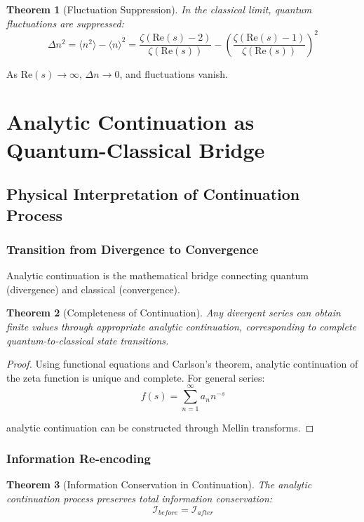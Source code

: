\documentclass[11pt]{article}
\theoremstyle{plain}
\newtheorem{theorem}{Theorem}[section]
\theoremstyle{definition}
\theoremstyle{remark}
\begin{document}
\begin{theorem}[Fluctuation Suppression]
In the classical limit, quantum fluctuations are suppressed:
$$\Delta n^2 = \langle n^2 \rangle - \langle n \rangle^2 = \frac{\zeta(\text{Re}(s)-2)}{\zeta(\text{Re}(s))} - \left(\frac{\zeta(\text{Re}(s)-1)}{\zeta(\text{Re}(s))}\right)^2$$
\end{theorem}

As $\text{Re}(s) \to \infty$, $\Delta n \to 0$, and fluctuations vanish.

\section{Analytic Continuation as Quantum-Classical Bridge}

\subsection{Physical Interpretation of Continuation Process}

\subsubsection{Transition from Divergence to Convergence}

Analytic continuation is the mathematical bridge connecting quantum (divergence) and classical (convergence).

\begin{theorem}[Completeness of Continuation]
Any divergent series can obtain finite values through appropriate analytic continuation, corresponding to complete quantum-to-classical state transitions.
\end{theorem}

\begin{proof}
Using functional equations and Carlson's theorem, analytic continuation of the zeta function is unique and complete. For general series:
$$f(s) = \sum_{n=1}^{\infty} a_n n^{-s}$$

analytic continuation can be constructed through Mellin transforms.
\end{proof}

\subsubsection{Information Re-encoding}

\begin{theorem}[Information Conservation in Continuation]
The analytic continuation process preserves total information conservation:
$$\mathcal{I}_{before} = \mathcal{I}_{after}$$
\end{theorem}
\end{document}
